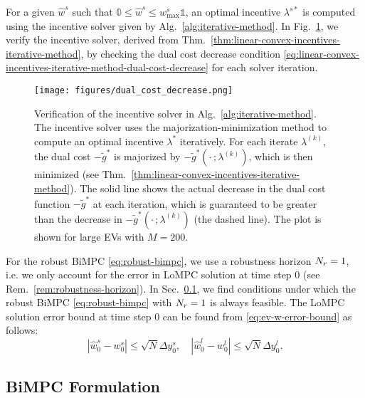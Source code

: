 For a given $\hat{w}^s$ such that $\mathbb{0} \leq \hat{w}^s \leq w^s_\text{max} \mathbb{1}$, an optimal incentive $\lambda^{s*}$ is computed using the incentive solver given by Alg.~\ref{alg:iterative-method}.
In Fig.~\ref{fig:ev-dual-cost-decrease}, we verify the incentive solver, derived from Thm.~\ref{thm:linear-convex-incentives-iterative-method}, by checking the dual cost decrease condition \eqref{eq:linear-convex-incentives-iterative-method-dual-cost-decrease} for each solver iteration.


\begin{figure}%
    \centering
    \texttt{[image: figures/dual\_cost\_decrease.png]}
    \caption{Verification of the incentive solver in Alg.~\ref{alg:iterative-method}.
    The incentive solver uses the majorization-minimization method to compute an optimal incentive $\lambda^*$ iteratively.
    For each iterate $\lambda^{(k)}$, the dual cost $-\tilde{g}^*$ is majorized by $-\tilde{g}^*(\cdot \,; \lambda^{(k)})$, which is then minimized (see Thm.~\ref{thm:linear-convex-incentives-iterative-method}).
    The solid line shows the actual decrease in the dual cost function $-\tilde{g}^*$ at each iteration, which is guaranteed to be greater than the decrease in $-\tilde{g}^*(\cdot \,; \lambda^{(k)})$ (the dashed line).
    The plot is shown for large EVs with $M = 200$.
    }
    \label{fig:ev-dual-cost-decrease}
\end{figure}

For the robust BiMPC \eqref{eq:robust-bimpc}, we use a robustness horizon $N_r = 1$, i.e. we only account for the error in LoMPC solution at time step $0$ (see Rem.~\ref{rem:robustness-horizon}).
In Sec.~\ref{subsec:ev-bimpc-formulation}, we find conditions under which the robust BiMPC \eqref{eq:robust-bimpc} with $N_r = 1$ is always feasible.
The LoMPC solution error bound at time step $0$ can be found from \eqref{eq:ev-w-error-bound} as follows:
\begin{equation}
\label{eq:ev-w0-error-bound}
    | \hat{w}^s_0 - w^s_0 | \leq \sqrt{N} \Delta y_0^s, \quad | \hat{w}^l_0 - w^l_0 | \leq \sqrt{N} \Delta y_0^l.
\end{equation}


\subsection{BiMPC Formulation}
\label{subsec:ev-bimpc-formulation}

